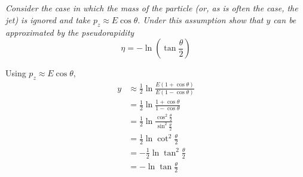 \documentclass{article}
\begin{document}
\newpage
\subsection{}
\textit{Consider the case in which the mass of the particle (or, as is often the case, the jet) is ignored and take $p_{z} \approx E \cos \theta .$ Under this assumption show that $y$ can be approximated by the pseudorapidity
$$
\eta=-\ln \left(\tan \frac{\theta}{2}\right)
$$}

Using $p_{z} \approx E \cos \theta$, 
\begin{align*}
    y &\approx \frac{1}{2} \ln \frac{E(1+\cos \theta)}{E(1-\cos \theta)}\\
    &=\frac{1}{2} \ln \frac{1+\cos \theta}{1-\cos \theta}\\
    &=\frac{1}{2} \ln \frac{\cos ^{2} \frac{\theta}{2}}{\sin ^{2} \frac{\theta}{2}}\\
    &=\frac{1}{2} \ln \cot ^{2} \frac{\theta}{2}\\
    &=-\frac{1}{2} \ln \tan ^{2} \frac{\theta}{2}\\
    &=-\ln \tan \frac{\theta}{2}
\end{align*}
\end{document}
